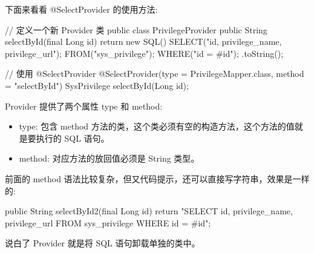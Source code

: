 下面来看看 @SelectProvider 的使用方法:

\begin{Java}
// 定义一个新 Provider 类
public class PrivilegeProvider {
    public String selectById(final Long id) {
        return new SQL(){
            {
                SELECT("id, privilege_name, privilege_url");
                FROM("sys_privilege");
                WHERE("id = #{id}");
            }
        }.toString();
    }
}
\end{Java}

\begin{Java}
// 使用 @SelectProvider
@SelectProvider(type = PrivilegeMapper.class, method = "selectById")
SysPrivilege selectById(Long id);
\end{Java}

Provider 提供了两个属性 type 和 method:
\begin{itemize}
    \item type: 包含 method 方法的类，这个类必须有空的构造方法，这个方法的值就是要执行的 SQL 语句。
    \item method: 对应方法的放回值必须是 String 类型。
\end{itemize}

前面的 method 语法比较复杂，但又代码提示，还可以直接写字符串，效果是一样的:

\begin{Java}
public String selectById2(final Long id) {
    return "SELECT id, privilege_name, privilege_url FROM sys_privilege WHERE id = #{id}";
}
\end{Java}

说白了 Provider 就是将 SQL 语句卸载单独的类中。

\newpage
